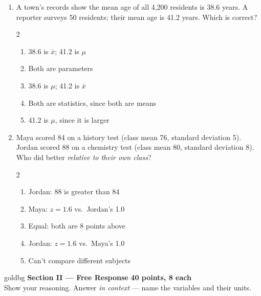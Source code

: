 \documentclass[12pt]{article}
\newenvironment{choices}
  {\begin{enumerate}[label=\textbf{(\Alph*)}, leftmargin=2.2em, itemsep=0pt, topsep=1pt]}
  {\end{enumerate}}
\newcommand{\letterroom}{\rule[-15pt]{0pt}{36pt}}
\begin{document}
\begin{enumerate}[leftmargin=1.9em, itemsep=0.03in]
  \boxguard[10]
  \item A town's records show the mean age of all 4,200 residents is 38.6 years. A reporter
        surveys 50 residents; their mean age is 41.2 years. Which is correct?
        \begin{multicols}{2}
        \begin{choices}
          \item 38.6 is $\bar x$; 41.2 is $\mu$
          \item Both are parameters
          \item 38.6 is $\mu$; 41.2 is $\bar x$
          \item Both are statistics, since both are means
          \item 41.2 is $\mu$, since it is larger
                \hfill{}\letterroom
        \end{choices}
        \end{multicols}

  \boxguard[11]
  \item Maya scored 84 on a history test (class mean 76, standard deviation 5). Jordan scored 88 on
        a chemistry test (class mean 80, standard deviation 8). Who did better \emph{relative to
        their own class}?\hfill{}\letterroom
        \begin{multicols}{2}
        \begin{choices}
          \item Jordan: 88 is greater than 84
          \item Maya: $z = 1.6$ vs.\ Jordan's 1.0
          \item Equal: both are 8 points above
          \item Jordan: $z = 1.6$ vs.\ Maya's 1.0
          \item Can't compare different subjects
        \end{choices}
        \end{multicols}

\end{enumerate}

\vspace{0.08in}

\boxguard[12]
\begin{headlinebox}{goldbg}
\small
\textbf{Section II --- Free Response} \hfill \textbf{40 points, 8 each}\\
Show your reasoning. Answer \emph{in context} --- name the variables and their units.
\end{headlinebox}
\end{document}
